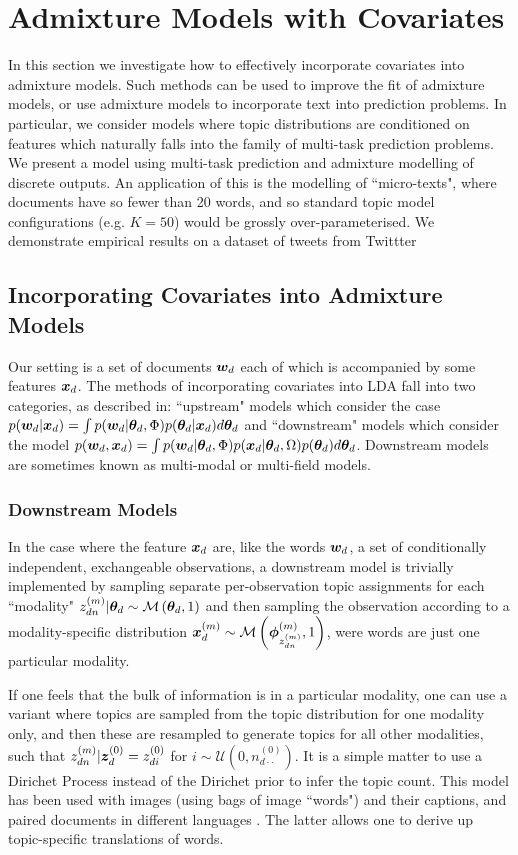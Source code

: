 
\chapter{Admixture Models with Covariates}
In this section we investigate how to effectively incorporate covariates into admixture models. Such methods can be used to improve the fit of admixture models, or use admixture models to incorporate text into prediction problems. In particular, we consider models where topic distributions are conditioned on features which naturally falls into the family of multi-task prediction problems. We present a model using multi-task prediction and admixture modelling of discrete outputs. An application of this is the modelling of ``micro-texts", where documents have so fewer than 20 words, and so standard topic model configurations (e.g. $K=50$) would be grossly over-parameterised. We demonstrate empirical results on a dataset of tweets from Twittter

\section{Incorporating Covariates into Admixture Models}
Our setting is a set of documents $\bm w_d$ each of which is accompanied by some features $\bm x_d$. The methods of incorporating covariates into LDA fall into two categories, as described in\cite{Mimno2008}: ``upstream" models which consider the case $p({ \bm w_d } | { \bm x_d }) = \int p({ \bm w_d }|{ \bm \theta_d }, \Phi)p({ \bm \theta_d }|{ \bm x_d }) d{ \bm \theta_d }$ 
and ``downstream" models which consider the model $p({ \bm w_d }, { \bm x_d }) = \int p({ \bm w_d }|{ \bm \theta_d }, \Phi)p({ \bm x_d }|{ \bm \theta_d }, \Omega)p({ \bm \theta_d })d{ \bm \theta_d }$. Downstream models are sometimes known as multi-modal\cite{Virtanen2012a} or multi-field\cite{Salomatin2009} models.

\subsection{Downstream Models}
In the case where the feature ${ \bm x_d }$ are, like the words ${ \bm w_d }$, a set of conditionally independent, exchangeable observations, a downstream model is trivially implemented\cite{Erosheva2004}\cite{Blei2003} by sampling separate per-observation topic assignments for each ``modality" $z_{dn}^{(m)}|{ \bm \theta_d } \sim \mathcal{M} \left( {{ \bm \theta_d }},{1} \right)$ and then sampling the observation according to a modality-specific distribution $\bm x_d^{(m)} \sim \mathcal{M} \left( {\bm \phi^{(m)}_{z^{(m)}_{dn}}},{1} \right)$, were words are just one particular modality.

If one feels that the bulk of information is in a particular modality, one can use a variant\cite{Blei2003} where topics are sampled from the topic distribution for one modality only, and then these are resampled to generate topics for all other modalities, such that $z_{dn}^{(m)}|\bm z_d^{(0)} = z_{di}^{(0)}$ for $i \sim \mathcal{U}(0, n_{d\cdot\cdot}^{(0)})$. It is a simple matter to use a Dirichet Process instead of the Dirichet prior to infer the topic count\cite{Yakhnenko2009}. This model has been used with images (using bags of image ``words") and their captions\cite{Blei2003}, and paired documents in different languages \cite{Zhao2001}. The latter allows one to derive up topic-specific translations of words.

